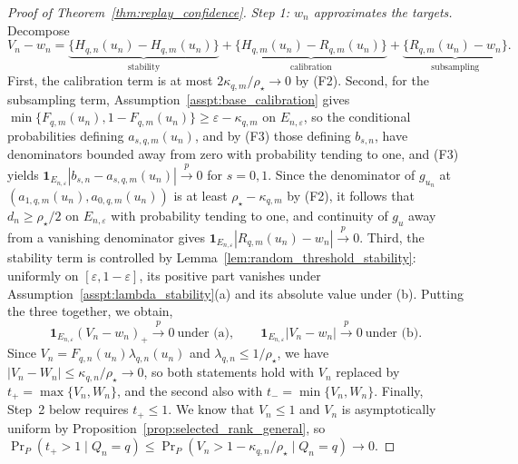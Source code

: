 \documentclass[10pt]{article}
\begin{document}
\begin{proof}[Proof of Theorem~\ref{thm:replay_confidence}]
\emph{Step 1: $w_n$ approximates the targets.}
Decompose
\begin{equation}\label{eq:ci_three_terms}
V_n-w_n
=\underbrace{\{H_{q,n}(u_n)-H_{q,m}(u_n)\}}_{\text{stability}}
+\underbrace{\{H_{q,m}(u_n)-R_{q,m}(u_n)\}}_{\text{calibration}}
+\underbrace{\{R_{q,m}(u_n)-w_n\}}_{\text{subsampling}} .
\end{equation}
First, the calibration term is at most $2\kappa_{q,m}/\rho_\star\to0$ by (F2). Second, for the subsampling term, Assumption~\ref{asspt:base_calibration} gives $\min\{F_{q,m}(u_n),1-F_{q,m}(u_n)\}\ge\varepsilon-\kappa_{q,m}$ on $E_{n,\varepsilon}$, so the conditional probabilities defining $a_{s,q,m}(u_n)$, and by (F3) those defining $b_{s,n}$, have denominators bounded away from zero with probability tending to one, and (F3) yields $\mathbf 1_{E_{n,\varepsilon}}|b_{s,n}-a_{s,q,m}(u_n)|\stackrel{p}{\longrightarrow}0$ for $s=0,1$. Since the denominator of $g_{u_n}$ at $(a_{1,q,m}(u_n),a_{0,q,m}(u_n))$ is at least $\rho_\star-\kappa_{q,m}$ by (F2), it follows that $d_n\ge\rho_\star/2$ on $E_{n,\varepsilon}$ with probability tending to one, and continuity of $g_u$ away from a vanishing denominator gives $\mathbf 1_{E_{n,\varepsilon}}|R_{q,m}(u_n)-w_n|\stackrel{p}{\longrightarrow}0$. Third, the stability term is controlled by Lemma~\ref{lem:random_threshold_stability}: uniformly on $[\varepsilon,1-\varepsilon]$, its positive part vanishes under Assumption~\ref{asspt:lambda_stability}(a) and its absolute value under (b). Putting the three together, we obtain,
\[
\mathbf 1_{E_{n,\varepsilon}}(V_n-w_n)_+\stackrel{p}{\longrightarrow}0
\ \text{under (a)},
\qquad
\mathbf 1_{E_{n,\varepsilon}}|V_n-w_n|\stackrel{p}{\longrightarrow}0
\ \text{under (b)}.
\]
Since $V_n=F_{q,n}(u_n)\lambda_{q,n}(u_n)$ and $\lambda_{q,n}\le1/\rho_\star$, we have $|V_n-W_n|\le\kappa_{q,n}/\rho_\star\to0$, so both statements hold with $V_n$ replaced by $t_+=\max\{V_n,W_n\}$, and the second also with $t_-=\min\{V_n,W_n\}$. Finally, Step~2 below requires $t_+\le1$. We know that $V_n\le1$ and $V_n$ is asymptotically uniform by Proposition~\ref{prop:selected_rank_general}, so $\Pr_P(t_+>1\mid Q_n=q)\le\Pr_P(V_n>1-\kappa_{q,n}/\rho_\star\mid Q_n=q)\to0$.


\end{proof}
\end{document}
